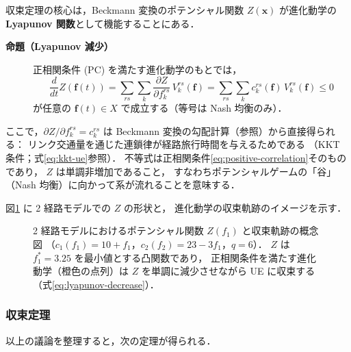 収束定理の核心は，Beckmann 変換のポテンシャル関数 $Z(\boldsymbol{x})$
が進化動学の\textbf{Lyapunov 関数}として機能することにある．

\begin{description}
  \item[\textbf{命題（Lyapunov 減少）}]
    正相関条件 (PC) を満たす進化動学のもとでは，
    \begin{equation}
      \frac{d}{dt} Z(\boldsymbol{f}(t))
      = \sum_{rs} \sum_{k} \frac{\partial Z}{\partial f_k^{rs}}\, V_k^{rs}(\boldsymbol{f})
      = \sum_{rs} \sum_{k} c_k^{rs}(\boldsymbol{f})\, V_k^{rs}(\boldsymbol{f})
      \leq 0
      \label{eq:lyapunov-decrease}
    \end{equation}
    が任意の $\boldsymbol{f}(t) \in X$ で成立する（等号は Nash 均衡のみ）．
\end{description}

ここで，$\partial Z / \partial f_k^{rs} = c_k^{rs}$ は
Beckmann 変換の勾配計算（参照）から直接得られる：
リンク交通量を通じた連鎖律が経路旅行時間を与えるためである
（KKT 条件；式\eqref{eq:kkt-ue}参照）．
不等式は正相関条件\eqref{eq:positive-correlation}そのものであり，
$Z$ は単調非増加であること，
すなわちポテンシャルゲームの「谷」（Nash 均衡）に向かって系が流れることを意味する．

図\ref{fig:potential-z} に 2 経路モデルでの $Z$ の形状と，
進化動学の収束軌跡のイメージを示す．

\begin{figure}[hbtp]
  \centering
  
  \caption{2 経路モデルにおけるポテンシャル関数 $Z(f_1)$ と収束軌跡の概念図
           （$c_1(f_1)=10+f_1$，$c_2(f_2)=23-3f_1$，$q=6$）．
           $Z$ は $f_1^* = 3.25$ を最小値とする凸関数であり，
           正相関条件を満たす進化動学（橙色の点列）は
           $Z$ を単調に減少させながら UE に収束する（式\eqref{eq:lyapunov-decrease}）．}
  \label{fig:potential-z}
\end{figure}

\subsubsection*{収束定理}

以上の議論を整理すると，次の定理が得られる．


